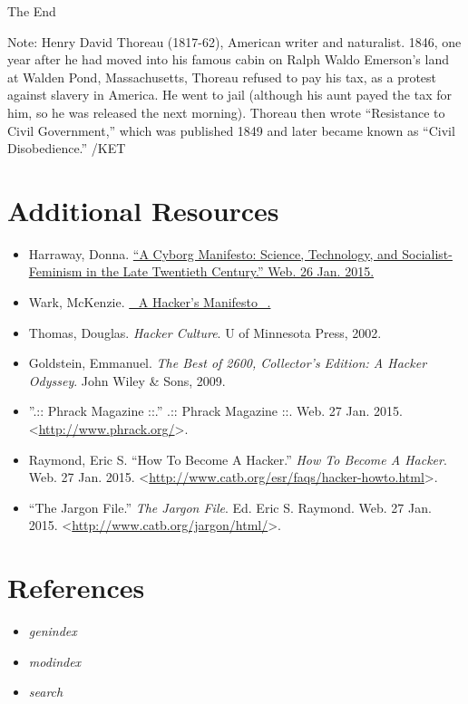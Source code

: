 \documentclass[letterpaper,12pt,english]{sphinxmanual}
\begin{document}
The End

Note: Henry David Thoreau (1817-62), American writer and naturalist. 1846, one year after he had moved into his famous cabin on Ralph Waldo Emerson's land at Walden Pond, Massachusetts, Thoreau refused to pay his tax, as a protest against slavery in America. He went to jail (although his aunt payed the tax for him, so he was released the next morning). Thoreau then wrote ``Resistance to Civil Government,'' which was published 1849 and later became known as ``Civil Disobedience.'' /KET


\chapter{Additional Resources}
\label{additional:additional-resources}\label{additional::doc}\begin{itemize}
\item {} 
Harraway, Donna. \href{http://www.egs.edu/faculty/donna-haraway/articles/donna-haraway-a-cyborg-manifesto/}{``A Cyborg Manifesto: Science, Technology, and Socialist-Feminism in the Late Twentieth Century.'' Web. 26 Jan. 2015.}

\item {} 
Wark, McKenzie. \href{http://subsol.c3.hu/subsol\_2/contributors0/warktext.html}{\_A Hacker's Manifesto\_.}

\item {} 
Thomas, Douglas. \emph{Hacker Culture}. U of Minnesota Press, 2002.

\item {} 
Goldstein, Emmanuel. \emph{The Best of 2600, Collector's Edition: A Hacker Odyssey}. John Wiley \& Sons, 2009.

\item {} 
''.:: Phrack Magazine ::.'' .:: Phrack Magazine ::. Web. 27 Jan. 2015. \textless{}\href{http://www.phrack.org/}{http://www.phrack.org/}\textgreater{}.

\item {} 
Raymond, Eric S. ``How To Become A Hacker.'' \emph{How To Become A Hacker}. Web. 27 Jan. 2015. \textless{}\href{http://www.catb.org/esr/faqs/hacker-howto.html}{http://www.catb.org/esr/faqs/hacker-howto.html}\textgreater{}.

\item {} 
``The Jargon File.'' \emph{The Jargon File}. Ed. Eric S. Raymond. Web. 27 Jan. 2015. \textless{}\href{http://www.catb.org/jargon/html/}{http://www.catb.org/jargon/html/}\textgreater{}.

\end{itemize}


\chapter{References}
\label{index:references}\begin{itemize}
\item {} 
\emph{genindex}

\item {} 
\emph{modindex}

\item {} 
\emph{search}

\end{itemize}



\renewcommand{\indexname}{Index}
\printindex
\end{document}
